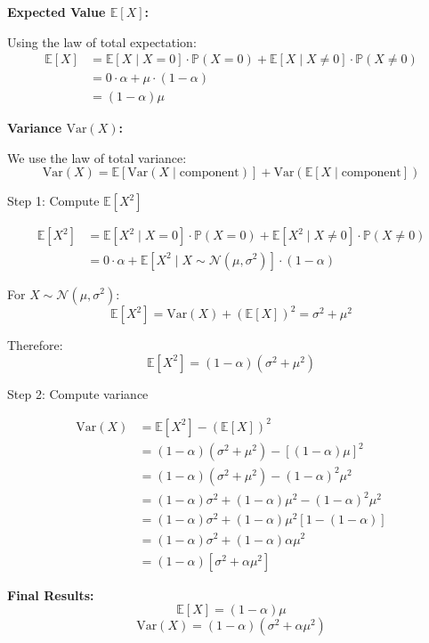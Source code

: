 \documentclass[12pt]{article}
\begin{document}
\begin{solution}
\textbf{Expected Value \(\mathbb{E}[X]\):}

Using the law of total expectation:
\begin{align}
\mathbb{E}[X] &= \mathbb{E}[X \mid X = 0] \cdot \mathbb{P}(X = 0) + \mathbb{E}[X \mid X \neq 0] \cdot \mathbb{P}(X \neq 0) \\
&= 0 \cdot \alpha + \mu \cdot (1-\alpha) \\
&= (1-\alpha)\mu
\end{align}

\textbf{Variance \(\text{Var}(X)\):}

We use the law of total variance:
\[
\text{Var}(X) = \mathbb{E}[\text{Var}(X \mid \text{component})] + \text{Var}(\mathbb{E}[X \mid \text{component}])
\]

Step 1: Compute \(\mathbb{E}[X^2]\)

\begin{align}
\mathbb{E}[X^2] &= \mathbb{E}[X^2 \mid X = 0] \cdot \mathbb{P}(X = 0) + \mathbb{E}[X^2 \mid X \neq 0] \cdot \mathbb{P}(X \neq 0) \\
&= 0 \cdot \alpha + \mathbb{E}[X^2 \mid X \sim \mathcal{N}(\mu, \sigma^2)] \cdot (1-\alpha)
\end{align}

For \(X \sim \mathcal{N}(\mu, \sigma^2)\):
\[
\mathbb{E}[X^2] = \text{Var}(X) + (\mathbb{E}[X])^2 = \sigma^2 + \mu^2
\]

Therefore:
\[
\mathbb{E}[X^2] = (1-\alpha)(\sigma^2 + \mu^2)
\]

Step 2: Compute variance

\begin{align}
\text{Var}(X) &= \mathbb{E}[X^2] - (\mathbb{E}[X])^2 \\
&= (1-\alpha)(\sigma^2 + \mu^2) - [(1-\alpha)\mu]^2 \\
&= (1-\alpha)(\sigma^2 + \mu^2) - (1-\alpha)^2\mu^2 \\
&= (1-\alpha)\sigma^2 + (1-\alpha)\mu^2 - (1-\alpha)^2\mu^2 \\
&= (1-\alpha)\sigma^2 + (1-\alpha)\mu^2[1 - (1-\alpha)] \\
&= (1-\alpha)\sigma^2 + (1-\alpha)\alpha\mu^2 \\
&= (1-\alpha)[\sigma^2 + \alpha\mu^2]
\end{align}

\textbf{Final Results:}
\[
\boxed{\mathbb{E}[X] = (1-\alpha)\mu}
\]
\[
\boxed{\text{Var}(X) = (1-\alpha)(\sigma^2 + \alpha\mu^2)}
\]
\end{solution}
\end{document}
